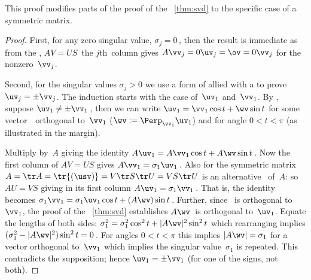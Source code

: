 \begin{aside} This proof modifies parts of the proof of the \svd\ \autoref{thm:svd} to the specific case of a symmetric matrix.
\end{aside}
\begin{proof} 
First, for any zero singular value, \(\sigma_j=0\)\,, then the result is immediate as from the \svd, \(AV=US\)\, the \(j\)th~column gives \(A\vv_j=0\uv_j=\ov=0\vv_j\) for the nonzero~\(\vv_j\).

Second, for the singular values \(\sigma_j>0\) we use a form of  allied with a  to prove \(\uv_j=\pm \vv_j\).
The induction starts with the case of~\(\uv_1\) and~\(\vv_1\).
By , suppose \(\uv_1\neq\pm\vv_1\)\,, then we can write \(\uv_1=\vv_1\cos t+\wv\sin t\) for some vector~\wv\ orthogonal to~\(\vv_1\) (\(\wv:=\Perp_{\vv_1}\uv_1\)) and for angle \(0< t<\pi\) (as illustrated in the margin).
\begin{comment}
Should eliminate the possibility of \(t=\pi\)??
\end{comment}
Multiply by~\(A\) giving the identity \(A\uv_1=A\vv_1\cos t+A\wv\sin t\)\,.
Now the first column of \(AV=US\) gives \(A\vv_1=\sigma_1\uv_1\)\,.
Also for the symmetric matrix \(A=\tr A=\tr{(\usv)}=V\tr S\tr U=VS\tr U\) is an alternative \svd\ of~\(A\):  
so \(AU=VS\) giving in its first column \(A\uv_1=\sigma_1\vv_1\)\,.
That is, the identity becomes \(\sigma_1\vv_1=\sigma_1\uv_1\cos t+(A\wv)\sin t\)\,.
Further, since \wv~is orthogonal to~\(\vv_1\), the proof of the \svd\ \autoref{thm:svd} establishes \(A\wv\)~is orthogonal to~\(\uv_1\).  
Equate the lengths of both sides: \(\sigma_1^2=\sigma_1^2\cos^2 t+|A\wv|^2\sin^2 t\) which rearranging implies \((\sigma_1^2-|A\wv|^2) \sin^2 t=0\)\,.
For angles \(0< t<\pi\) this implies \(|A\wv|=\sigma_1\) for a vector orthogonal to~\(\vv_1\) which implies the singular value~\(\sigma_1\) is repeated.  
This contradicts the supposition; hence \(\uv_1=\pm\vv_1\) (for one of the signs, not both).


\end{proof}
